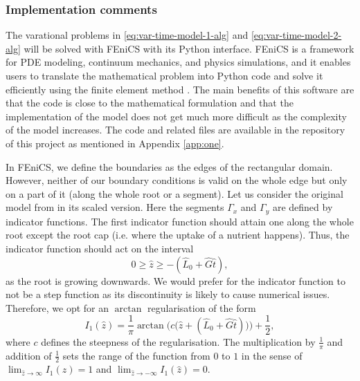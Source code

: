 \documentclass[11pt]{article}
\numberwithin{equation}{section}
\begin{document}
\subsubsection{Implementation comments}

The varational problems in \eqref{eq:var-time-model-1-alg} and \eqref{eq:var-time-model-2-alg} will be solved with FEniCS \cite{AlnaesBlechta2015a} with its Python interface. 
FEniCS is a framework for PDE modeling, continuum mechanics, and physics simulations, and it enables users to translate the mathematical problem into Python code and solve it efficiently using the finite element method \cite{fenics}. The main benefits of this software are that the code is close to the mathematical formulation and that the implementation of the model does not get much more difficult as the complexity of the model increases.
The code and related files are available in the repository of this project as mentioned in Appendix \ref{app:one}.


In FEniCS, we define the boundaries as the edges of the rectangular domain. However, neither of our boundary conditions is valid on the whole edge but only on a part of it (along the whole root or a segment).
Let us consider the original model from \cite{Ptashnyk-2011} in its scaled version. Here the segments \(\Gamma_x\) and \(\Gamma_y\) are defined by indicator functions. 
The first indicator function should attain one along the whole root except the root cap (i.e. where the uptake of a nutrient happens). Thus, the indicator function should act on the interval 
\[
    0 \geq \hat{z} \geq -(\hat{L}_0 + \hat{G} \hat{t} ),
\]
as the root is growing downwards. We would prefer for the indicator function to not be a step function as its discontinuity is likely to cause numerical issues. Therefore, we opt for an $\arctan$ regularisation of the form
\begin{equation}
    I_1 (\hat z) = \frac{1}{\pi} \arctan\Big(c \big(\hat z + (\hat L_0 + \hat G \hat t) \big) \Big) + \frac{1}{2},
\end{equation}
where $c$ defines the steepness of the regularisation. The multiplication by $\frac{1}{\pi}$ and addition of $\frac{1}{2}$ sets the range of the function from $0$ to $1$ in the sense of $\lim_{\hat z \to \infty} I_1(\hat z) = 1$ and $\lim_{\hat z \to -\infty} I_1(\hat z) = 0$.
\end{document}
